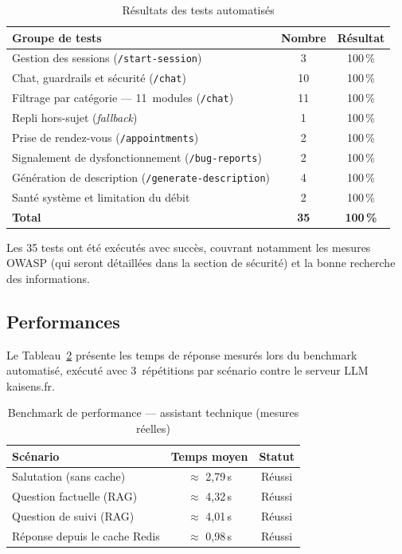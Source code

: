\vspace{6pt}
\begin{table}[H]
\centering
\caption{Résultats des tests automatisés}
\label{tab:tests_support}
\begin{tabular}{|l|c|c|}
\hline
\textbf{Groupe de tests} & \textbf{Nombre} & \textbf{Résultat} \\
\hline
Gestion des sessions (\texttt{/start-session}) & 3 & 100\,\% \\
Chat, guardrails et sécurité (\texttt{/chat}) & 10 & 100\,\% \\
Filtrage par catégorie — 11~modules (\texttt{/chat}) & 11 & 100\,\% \\
Repli hors-sujet (\emph{fallback}) & 1 & 100\,\% \\
Prise de rendez-vous (\texttt{/appointments}) & 2 & 100\,\% \\
Signalement de dysfonctionnement (\texttt{/bug-reports}) & 2 & 100\,\% \\
Génération de description (\texttt{/generate-description}) & 4 & 100\,\% \\
Santé système et limitation du débit & 2 & 100\,\% \\
\hline
\textbf{Total} & \textbf{35} & \textbf{100\,\%} \\
\hline
\end{tabular}
\end{table}
Les 35 tests ont été exécutés avec succès, couvrant notamment les
mesures OWASP (qui seront détaillées dans la section de sécurité) et la bonne recherche des informations.

\subsection{Performances}

Le Tableau~\ref{tab:perf_support} présente les temps de réponse mesurés lors du benchmark
automatisé, exécuté avec 3~répétitions par scénario
contre le serveur LLM kaisens.fr.

\vspace{6pt}
\begin{table}[H]
\centering
\caption{Benchmark de performance — assistant technique (mesures réelles)}
\label{tab:perf_support}
\begin{tabular}{|l|c|c|}
\hline
\textbf{Scénario} & \textbf{Temps moyen} & \textbf{Statut} \\
\hline
Salutation (sans cache) & $\approx$ 2{,}79\,s & Réussi \\
Question factuelle (RAG) & $\approx$ 4{,}32\,s & Réussi \\
Question de suivi (RAG) & $\approx$ 4{,}01\,s & Réussi \\
Réponse depuis le cache Redis & $\approx$ 0{,}98\,s & Réussi \\
\hline
\end{tabular}
\end{table}

